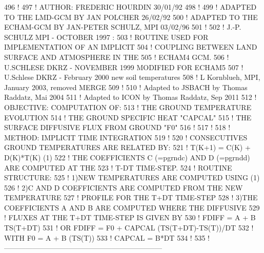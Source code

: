 \begin{DoxyCode}
496 \textcolor{comment}{!}
497 \textcolor{comment}{!   AUTHOR:  FREDERIC HOURDIN     30/01/92}
498 \textcolor{comment}{!}
499 \textcolor{comment}{!            ADAPTED TO THE LMD-GCM BY JAN POLCHER  26/02/92}
500 \textcolor{comment}{!            ADAPTED TO THE ECHAM-GCM BY JAN-PETER SCHULZ, MPI  03/02/96}
501 \textcolor{comment}{!}
502 \textcolor{comment}{!            J.-P. SCHULZ   MPI - OCTOBER 1997 :}
503 \textcolor{comment}{!               ROUTINE USED FOR IMPLEMENTATION OF AN IMPLICIT}
504 \textcolor{comment}{!               COUPLING BETWEEN LAND SURFACE AND ATMOSPHERE IN THE}
505 \textcolor{comment}{!               ECHAM4 GCM.}
506 \textcolor{comment}{!            U.SCHLESE DKRZ - NOVEMBER 1999  MODIFIED FOR ECHAM5}
507 \textcolor{comment}{!            U.Schlese DKRZ - February 2000  new soil temperatures}
508 \textcolor{comment}{!            L Kornblueh, MPI, January 2003, removed MERGE}
509 \textcolor{comment}{!}
510 \textcolor{comment}{!            Adapted to JSBACH by Thomas Raddatz, Mai 2004}
511 \textcolor{comment}{!            Adapted to ICON  by Thomas Raddatz, Sep 2011}
512 \textcolor{comment}{!   OBJECTIVE:  COMPUTATION OF:}
513 \textcolor{comment}{!               THE GROUND TEMPERATURE EVOLUTION}
514 \textcolor{comment}{!               THE GROUND SPECIFIC HEAT "CAPCAL"}
515 \textcolor{comment}{!               THE SURFACE DIFFUSIVE FLUX FROM GROUND "F0"}
516 \textcolor{comment}{!}
517 \textcolor{comment}{!}
518 \textcolor{comment}{!   METHOD:  IMPLICIT TIME INTEGRATION}
519 \textcolor{comment}{!}
520 \textcolor{comment}{!   CONSECUTIVES GROUND TEMPERATURES ARE RELATED BY:}
521 \textcolor{comment}{!           T(K+1) = C(K) + D(K)*T(K)  (1)}
522 \textcolor{comment}{!   THE COEFFICIENTS C (=pgrndc) AND D (=pgrndd) ARE COMPUTED AT THE}
523 \textcolor{comment}{!   T-DT TIME-STEP.}
524 \textcolor{comment}{!   ROUTINE STRUCTURE:}
525 \textcolor{comment}{!   1)NEW TEMPERATURES ARE COMPUTED  USING (1)}
526 \textcolor{comment}{!   2)C AND D COEFFICIENTS ARE COMPUTED FROM THE NEW TEMPERATURE}
527 \textcolor{comment}{!     PROFILE FOR THE T+DT TIME-STEP}
528 \textcolor{comment}{!   3)THE COEFFICIENTS A AND B ARE COMPUTED WHERE THE DIFFUSIVE}
529 \textcolor{comment}{!     FLUXES AT THE T+DT TIME-STEP IS GIVEN BY}
530 \textcolor{comment}{!            FDIFF = A + B TS(T+DT)}
531 \textcolor{comment}{!     OR     FDIFF = F0 + CAPCAL (TS(T+DT)-TS(T))/DT}
532 \textcolor{comment}{!            WITH F0 = A + B (TS(T))}
533 \textcolor{comment}{!                 CAPCAL = B*DT}
534 \textcolor{comment}{!}
535 \textcolor{comment}{!     ------------------------------------------------------------------}

\end{DoxyCode}
